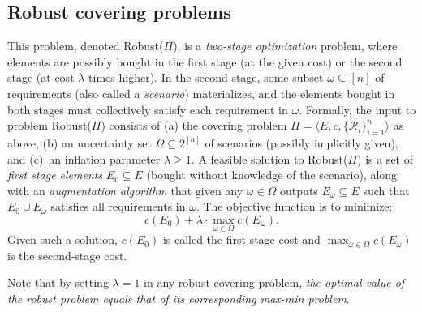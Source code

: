 \documentclass[11pt,letterpaper]{article}
\def\cov{\ensuremath{\Pi}\xspace}
\def\rcov{{\sf Robust(\cov)}\xspace}
\newcommand{\sse}{\subseteq}
\newcounter{note}[section]
\begin{document}
\subsection{Robust covering problems}
This problem, denoted \rcov, is a {\em two-stage optimization} problem, where elements are possibly bought in the first
stage (at the given cost) or the second stage (at cost $\lambda$ times higher). In the second stage, some subset
$\omega \sse[n]$ of requirements (also called a \emph{scenario}) materializes, and the elements bought in both stages
must collectively satisfy each requirement in $\omega$. Formally, the input to problem \rcov consists of (a) the
covering problem $\cov = \langle E,c, \{\mathcal{R}_i\}_{i=1}^n\rangle$ as above, (b) an uncertainty set $\Omega\sse
2^{[n]}$ of scenarios (possibly implicitly given), and (c)~an inflation parameter $\lambda\ge 1$. A feasible solution
to \rcov is a set of {\em
  first stage elements} $E_0\sse E$ (bought without knowledge of the
scenario), along with an {\em augmentation algorithm} that given any $\omega\in \Omega$ outputs $E_\omega \sse E$ such
that $E_0\cup E_\omega$ satisfies all requirements in $\omega$.  The objective function is  to minimize:
$$c(E_0) + \lambda \cdot \max_{\omega\in\Omega} c(E_\omega).$$
Given such a solution, $c(E_0)$ is called the first-stage cost and
$\max_{\omega\in\Omega} c(E_\omega)$ is the second-stage cost.


Note that by setting $\lambda=1$ in any robust covering problem, \emph{the optimal value of the robust problem equals
that of its corresponding max-min problem}.
\end{document}
